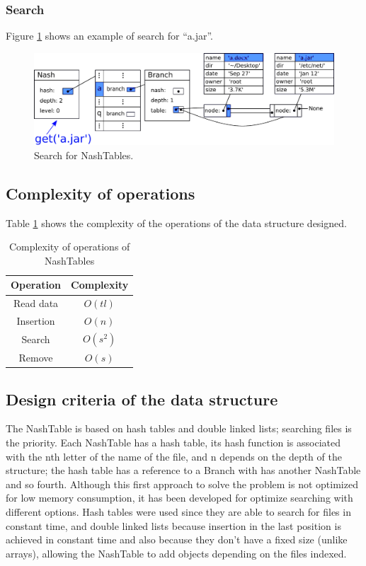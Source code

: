 \documentclass{sig-alternate-05-2015}
\begin{document}
  \subsubsection{Search}
  Figure \ref{img:nashGet} shows an example of search for ``a.jar''.
  \begin{figure}[t]
    \centering
    \includegraphics[scale=0.4]{NashGet.pdf}
    \caption{Search for NashTables.}
    \label{img:nashGet}
  \end{figure}

  \subsection{Complexity of operations}
  Table \ref{table:Complex} shows the complexity of the operations of the data structure designed.
  \begin{table}[b]
  \centering
  \caption{Complexity of operations of NashTables}
  \label{table:Complex}
  \begin{tabular}{cc}
  \hline
  \textbf{Operation} & \textbf{Complexity} \\ \hline
    Read data          & $O(tl)$             \\
    Insertion          & $O(n)$              \\
    Search             & $O(s^2)$            \\
    Remove             & $O(s)$              \\ \hline
  \end{tabular}
  \end{table}


  \subsection{Design criteria of the data structure}
    The NashTable is based on hash tables and double linked lists; searching files
    is the priority. Each NashTable has a hash table, its hash function is associated with the
    nth letter of the name of the file, and n depends on the depth of the structure;
    the hash table has a reference to a Branch with has another NashTable and so fourth.
    Although this first approach to solve the problem is not optimized for low memory consumption,
    it has been developed for optimize searching with different options. Hash tables were used since
    they are able to search for files in constant time, and double linked lists because insertion in the last position is achieved in constant time
    and also because they don't have a fixed size (unlike arrays), allowing the NashTable to add objects depending on the files indexed.
\end{document}
